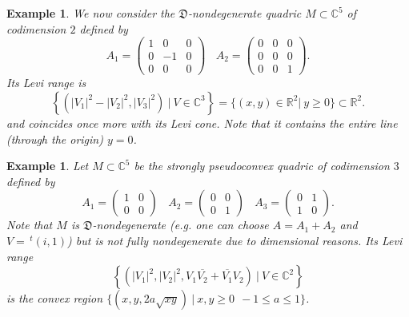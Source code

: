 \documentclass[10pt,a4paper]{amsart}
\newcommand{\C}{\mathbb C}
\newcommand{\R}{\mathbb R}
\newcommand{\transp}{\,^t}
\newtheorem{example}[theo]{Example}
\numberwithin{equation}{section}
\begin{document}
\begin{example}
We  now consider the $\mathfrak{D}$-nondegenerate quadric $M\subset \C^5$ of codimension $2$ defined by   
$$A_1=
\begin{pmatrix}
	1& 0 & 0 \\ 0 &-1 & 0 \\ 0 &0 & 0
\end{pmatrix} \ \ \ \ A_2=
\begin{pmatrix}
	0& 0 & 0 \\ 0 &0 & 0 \\ 0 &0 & 1
\end{pmatrix}.$$
Its Levi range is 
 $$\left\{\left(|V_1|^2-|V_2|^2,|V_3|^2\right) \ | \ V\in \C^3 \right\}=\{(x,y) \in \R^2 |  \ y\geq 0\}\subset \R^2.$$
 and coincides once more with its Levi cone. Note that it contains the entire line (through the origin) $y=0$.  
\end{example}    

\begin{example}\label{exrank}
Let $M\subset \C^5$ be the strongly pseudoconvex quadric of codimension $3$ defined by   
$$A_1=
\begin{pmatrix}
	1& 0 \\ 0 &0 
\end{pmatrix} \ \ \ \ 
A_2=
\begin{pmatrix}
	0& 0 \\ 0 &1 
\end{pmatrix}\ \ \ \ 
A_3=
\begin{pmatrix}
	0& 1 \\ 1 &0 
\end{pmatrix}.$$
Note that $M$ is $\mathfrak{D}$-nondegenerate (e.g. one can choose $A=A_1+A_2$ and $V=\transp(i,1)$) but is not fully nondegenerate due to dimensional reasons.
Its Levi range
 $$\left\{\left(|V_1|^2,|V_2|^2,V_1\overline{V_2}+\overline{V_1}V_2\right) \ | \ V\in \C^2 \right\}$$ 
 is the convex region $\{(x,y,2a\sqrt{xy}) \ | \ x,y\geq 0 \ \  -1\leq a \leq 1\}$. 
\end{example} 
\end{document}
